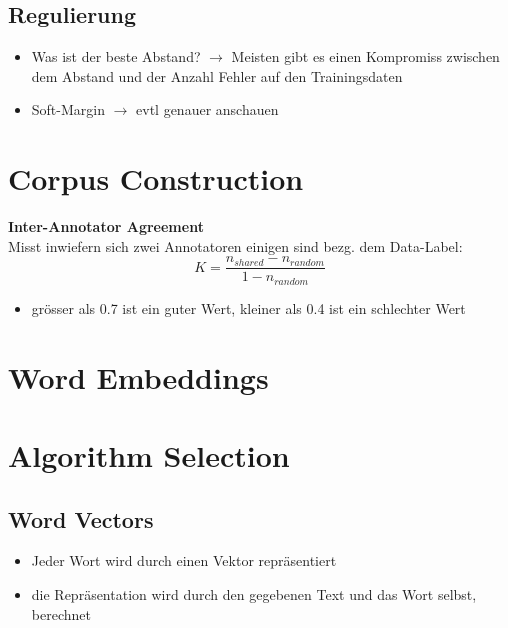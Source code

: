 \documentclass{article}
\theoremstyle{merke}
\theoremstyle{definition}
\begin{document}
        \subsection{Regulierung}
    \begin{itemize}
        \item Was ist der beste Abstand? $\rightarrow$ Meisten gibt es einen Kompromiss zwischen dem Abstand und der Anzahl Fehler auf den Trainingsdaten
        \item Soft-Margin $\rightarrow$ evtl genauer anschauen %
    \end{itemize}


    \section{Corpus Construction}
    \textbf{Inter-Annotator Agreement}\\
    Misst inwiefern sich zwei Annotatoren einigen sind bezg. dem Data-Label:
    \begin{equation}
        K = \frac{n_{shared} - n_{random}}{1-n_{random}}
    \end{equation}
    \begin{itemize}
        \item grösser als 0.7 ist ein guter Wert, kleiner als 0.4 ist ein schlechter Wert
    \end{itemize}   

    \section{Word Embeddings}
    

    \section{Algorithm Selection}
	    \subsection{Word Vectors}
        \begin{itemize}
            \item Jeder Wort wird durch einen Vektor repräsentiert
            \item die Repräsentation wird durch den gegebenen Text und das Wort selbst, berechnet
        \end{itemize}
\end{document}
